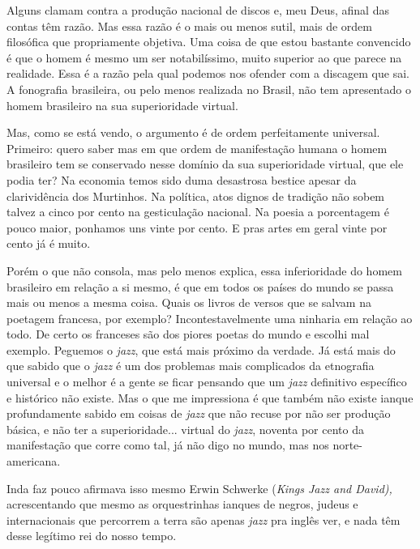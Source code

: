 

Alguns clamam contra a produção nacional de discos e, meu Deus, afinal
das contas têm razão. Mas essa razão é o mais ou menos sutil, mais de
ordem filosófica que propriamente objetiva. Uma coisa de que estou
bastante convencido é que o homem é mesmo um ser notabilíssimo, muito
superior ao que parece na realidade. Essa é a razão pela qual podemos
nos ofender com a discagem que sai. A fonografia brasileira, ou pelo
menos realizada no Brasil, não tem apresentado o homem brasileiro na sua
superioridade virtual.

Mas, como se está vendo, o argumento é de ordem perfeitamente universal.
Primeiro: quero saber mas em que ordem de manifestação humana o homem
brasileiro tem se conservado nesse domínio da sua superioridade virtual,
que ele podia ter? Na economia temos sido duma desastrosa bestice apesar
da clarividência dos Murtinhos. Na política, atos dignos de tradição não
sobem talvez a cinco por cento na gesticulação nacional. Na poesia a
porcentagem é pouco maior, ponhamos uns vinte por cento. E pras artes em
geral vinte por cento já é muito.

Porém o que não consola, mas pelo menos explica, essa inferioridade do
homem brasileiro em relação a si mesmo, é que em todos os países do
mundo se passa mais ou menos a mesma coisa. Quais os livros de versos
que se salvam na poetagem francesa, por exemplo? Incontestavelmente uma
ninharia em relação ao todo. De certo os franceses são dos piores poetas
do mundo e escolhi mal exemplo. Peguemos o \emph{jazz}, que está mais
próximo da verdade. Já está mais do que sabido que o \emph{jazz} é um
dos problemas mais complicados da etnografia universal e o melhor é a
gente se ficar pensando que um \emph{jazz} definitivo específico e
histórico não existe. Mas o que me impressiona é que também não existe
ianque profundamente sabido em coisas de \emph{jazz} que não recuse por
não ser produção básica, e não ter a superioridade... virtual do
\emph{jazz}, noventa por cento da manifestação que corre como tal, já
não digo no mundo, mas nos norte-americana.

Inda faz pouco afirmava isso mesmo Erwin Schwerke (\emph{Kings Jazz and
David),} acrescentando que mesmo as orquestrinhas ianques de negros,
judeus e internacionais que percorrem a terra são apenas \emph{jazz} pra
inglês ver, e nada têm desse legítimo rei do nosso tempo.

